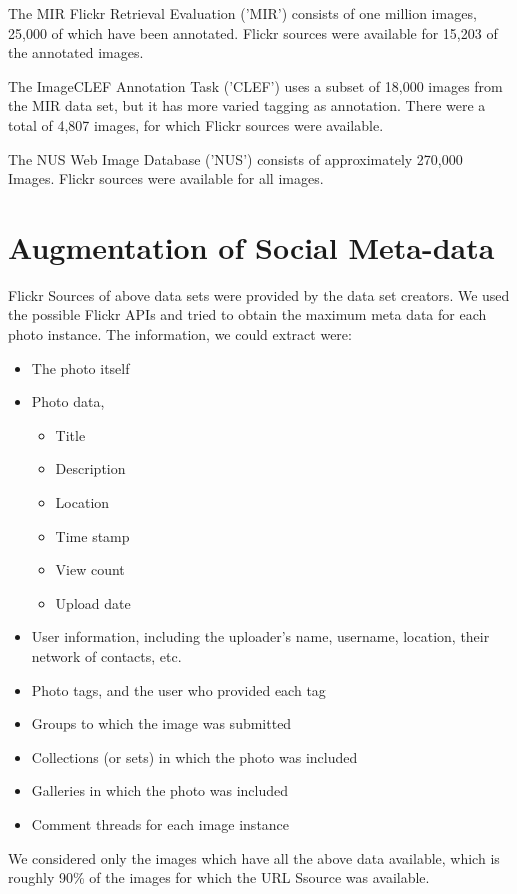 The MIR Flickr Retrieval Evaluation ('MIR') consists of 
one million images, 25,000 of which have been annotated. Flickr 
sources were available for 15,203 of the annotated images.

The ImageCLEF Annotation Task ('CLEF') uses a subset of 
18,000 images from the MIR data set, but it has more varied tagging 
as annotation. There were a total of 4,807 images, for which Flickr 
sources were available.  

The NUS Web Image Database ('NUS') consists of 
approximately 270,000 Images. Flickr sources were available for all 
images.
\section{Augmentation of Social Meta-data}
Flickr Sources of above data sets were provided by the data set 
creators. We used the possible Flickr APIs and tried to obtain the 
maximum meta data for each photo instance. The information, we could 
extract were:
\begin{itemize}
\item 	The photo itself
\item 	Photo data,
\begin{itemize}
\item Title
\item Description
\item Location
\item Time stamp
\item View count
\item Upload date
\end{itemize}
\item 	User information, including the uploader's name, username, location, their network of contacts, etc.
\item 	Photo tags, and the user who provided each tag
\item 	Groups to which the image was submitted 
\item 	Collections (or sets) in which the photo was included 
\item 	Galleries in which the photo was included 
\item 	 Comment threads for each image instance
\end{itemize}
We considered only the images which have all the above data available, 
which is roughly 90\% of the images for which the URL Ssource was available.
